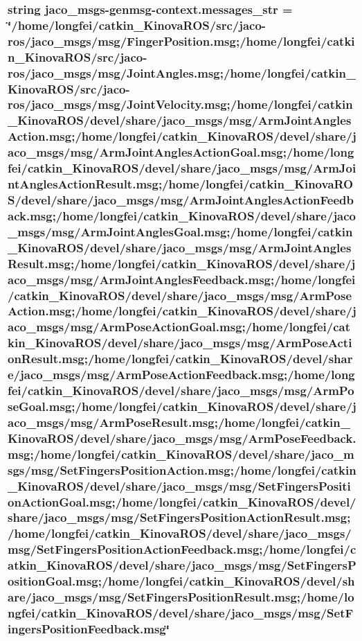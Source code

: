 \subsubsection[{\texorpdfstring{messages\+\_\+str}{messages_str}}]{\setlength{\rightskip}{0pt plus 5cm}string jaco\+\_\+msgs-\/genmsg-\/context.\+messages\+\_\+str = \char`\"{}/home/longfei/catkin\+\_\+\+Kinova\+R\+OS/src/jaco-\/ros/jaco\+\_\+msgs/msg/Finger\+Position.\+msg;/home/longfei/catkin\+\_\+\+Kinova\+R\+OS/src/jaco-\/ros/jaco\+\_\+msgs/msg/Joint\+Angles.\+msg;/home/longfei/catkin\+\_\+\+Kinova\+R\+OS/src/jaco-\/ros/jaco\+\_\+msgs/msg/Joint\+Velocity.\+msg;/home/longfei/catkin\+\_\+\+Kinova\+R\+OS/devel/share/jaco\+\_\+msgs/msg/Arm\+Joint\+Angles\+Action.\+msg;/home/longfei/catkin\+\_\+\+Kinova\+R\+OS/devel/share/jaco\+\_\+msgs/msg/Arm\+Joint\+Angles\+Action\+Goal.\+msg;/home/longfei/catkin\+\_\+\+Kinova\+R\+OS/devel/share/jaco\+\_\+msgs/msg/Arm\+Joint\+Angles\+Action\+Result.\+msg;/home/longfei/catkin\+\_\+\+Kinova\+R\+OS/devel/share/jaco\+\_\+msgs/msg/Arm\+Joint\+Angles\+Action\+Feedback.\+msg;/home/longfei/catkin\+\_\+\+Kinova\+R\+OS/devel/share/jaco\+\_\+msgs/msg/Arm\+Joint\+Angles\+Goal.\+msg;/home/longfei/catkin\+\_\+\+Kinova\+R\+OS/devel/share/jaco\+\_\+msgs/msg/Arm\+Joint\+Angles\+Result.\+msg;/home/longfei/catkin\+\_\+\+Kinova\+R\+OS/devel/share/jaco\+\_\+msgs/msg/Arm\+Joint\+Angles\+Feedback.\+msg;/home/longfei/catkin\+\_\+\+Kinova\+R\+OS/devel/share/jaco\+\_\+msgs/msg/Arm\+Pose\+Action.\+msg;/home/longfei/catkin\+\_\+\+Kinova\+R\+OS/devel/share/jaco\+\_\+msgs/msg/Arm\+Pose\+Action\+Goal.\+msg;/home/longfei/catkin\+\_\+\+Kinova\+R\+OS/devel/share/jaco\+\_\+msgs/msg/Arm\+Pose\+Action\+Result.\+msg;/home/longfei/catkin\+\_\+\+Kinova\+R\+OS/devel/share/jaco\+\_\+msgs/msg/Arm\+Pose\+Action\+Feedback.\+msg;/home/longfei/catkin\+\_\+\+Kinova\+R\+OS/devel/share/jaco\+\_\+msgs/msg/Arm\+Pose\+Goal.\+msg;/home/longfei/catkin\+\_\+\+Kinova\+R\+OS/devel/share/jaco\+\_\+msgs/msg/Arm\+Pose\+Result.\+msg;/home/longfei/catkin\+\_\+\+Kinova\+R\+OS/devel/share/jaco\+\_\+msgs/msg/Arm\+Pose\+Feedback.\+msg;/home/longfei/catkin\+\_\+\+Kinova\+R\+OS/devel/share/jaco\+\_\+msgs/msg/Set\+Fingers\+Position\+Action.\+msg;/home/longfei/catkin\+\_\+\+Kinova\+R\+OS/devel/share/jaco\+\_\+msgs/msg/Set\+Fingers\+Position\+Action\+Goal.\+msg;/home/longfei/catkin\+\_\+\+Kinova\+R\+OS/devel/share/jaco\+\_\+msgs/msg/Set\+Fingers\+Position\+Action\+Result.\+msg;/home/longfei/catkin\+\_\+\+Kinova\+R\+OS/devel/share/jaco\+\_\+msgs/msg/Set\+Fingers\+Position\+Action\+Feedback.\+msg;/home/longfei/catkin\+\_\+\+Kinova\+R\+OS/devel/share/jaco\+\_\+msgs/msg/Set\+Fingers\+Position\+Goal.\+msg;/home/longfei/catkin\+\_\+\+Kinova\+R\+OS/devel/share/jaco\+\_\+msgs/msg/Set\+Fingers\+Position\+Result.\+msg;/home/longfei/catkin\+\_\+\+Kinova\+R\+OS/devel/share/jaco\+\_\+msgs/msg/Set\+Fingers\+Position\+Feedback.\+msg\char`\"{}}\hypertarget{namespacejaco__msgs-genmsg-context_ad0c0ed6261db181e8c56cce39be2eec2}{}\label{namespacejaco__msgs-genmsg-context_ad0c0ed6261db181e8c56cce39be2eec2}
